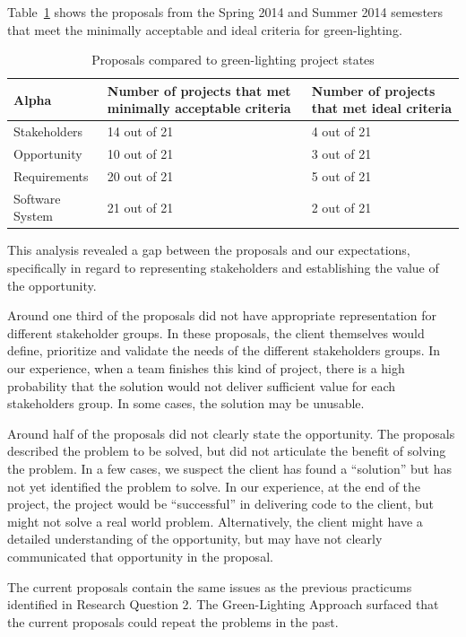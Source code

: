 \documentclass[conference]{IEEEtran}
\begin{document}
Table~\ref{table_proposal_evaluations} shows the proposals from the Spring 2014 and Summer 2014 semesters that meet the minimally acceptable and ideal criteria for green-lighting. 

\begin{table}
\caption{Proposals compared to green-lighting project states}
\label{table_proposal_evaluations}
\begin{tabular}{|l|p{1.10in}|p{1.10in}|}
\hline
Alpha & Number of projects that met minimally acceptable criteria & Number of projects that met ideal criteria \\ \hline
Stakeholders & 14 out of 21 & 4 out of 21 \\ \hline
Opportunity & 10 out of 21 & 3 out of 21 \\ \hline
Requirements & 20 out of 21 & 5 out of 21 \\ \hline
Software System & 21 out of 21 & 2 out of 21 \\
\hline
\end{tabular}
\end{table}

This analysis revealed a gap between the proposals and our
expectations, specifically in regard to representing stakeholders and
establishing the value of the opportunity.

Around one third of the proposals did not have appropriate
representation for different stakeholder groups. In these proposals, the
client themselves would define, prioritize and validate the needs of the
different stakeholders groups. In our experience, when a team finishes
this kind of project, there is a high probability that the solution
would not deliver sufficient value for each stakeholders group. In some
cases, the solution may be unusable.

Around half of the proposals did not clearly state the
opportunity. The proposals described the problem to be solved, but did
not articulate the benefit of solving the problem. In a few cases, we
suspect the client has found a ``solution'' but has not yet identified
the problem to solve. In our experience, at the end of the project,
the project would be ``successful'' in delivering code to the client,
but might not solve a real world problem. Alternatively, the client
might have a detailed understanding of the opportunity, but may have not
clearly communicated that opportunity in the proposal.

The current proposals contain the same issues as the previous practicums
identified in Research Question 2. The Green-Lighting Approach surfaced
that the current proposals could repeat the problems in the past.
\end{document}
